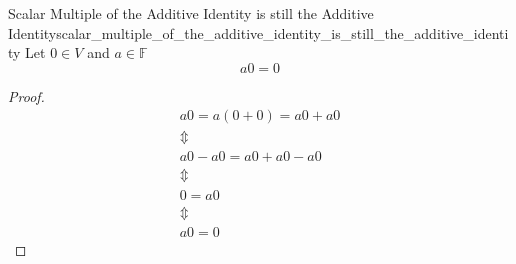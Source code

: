 \begin{proposition}{Scalar Multiple of the Additive Identity is still the
Additive
Identity}{scalar_multiple_of_the_additive_identity_is_still_the_additive_identity}
Let \( 0 \in  V \) and \( a \in \mathbb{F} \) 
\[
a 0 = 0
\]
\end{proposition}
\begin{proof}
    \begin{gather*}
        a0 =  a \left( 0 +  0  \right) =  a0 +  a0 \\
        \Updownarrow \\
        a0 -  a0 =  a 0 +  a0 -  a0 \\
        \Updownarrow \\
        0 =  a0 \\
        \Updownarrow \\
        a0 =  0
    \end{gather*}
\end{proof}
